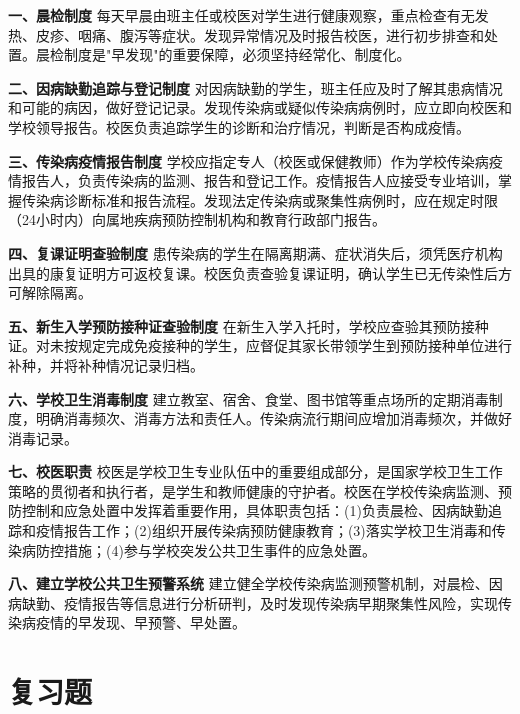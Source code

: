 \begin{keybox}
\textbf{一、晨检制度}
每天早晨由班主任或校医对学生进行健康观察，重点检查有无发热、皮疹、咽痛、腹泻等症状。发现异常情况及时报告校医，进行初步排查和处置。晨检制度是"早发现"的重要保障，必须坚持经常化、制度化。

\textbf{二、因病缺勤追踪与登记制度}
对因病缺勤的学生，班主任应及时了解其患病情况和可能的病因，做好登记记录。发现传染病或疑似传染病病例时，应立即向校医和学校领导报告。校医负责追踪学生的诊断和治疗情况，判断是否构成疫情。

\textbf{三、传染病疫情报告制度}
学校应指定专人（校医或保健教师）作为学校传染病疫情报告人，负责传染病的监测、报告和登记工作。疫情报告人应接受专业培训，掌握传染病诊断标准和报告流程。发现法定传染病或聚集性病例时，应在规定时限（24小时内）向属地疾病预防控制机构和教育行政部门报告。

\textbf{四、复课证明查验制度}
患传染病的学生在隔离期满、症状消失后，须凭医疗机构出具的康复证明方可返校复课。校医负责查验复课证明，确认学生已无传染性后方可解除隔离。

\textbf{五、新生入学预防接种证查验制度}
在新生入学入托时，学校应查验其预防接种证。对未按规定完成免疫接种的学生，应督促其家长带领学生到预防接种单位进行补种，并将补种情况记录归档。

\textbf{六、学校卫生消毒制度}
建立教室、宿舍、食堂、图书馆等重点场所的定期消毒制度，明确消毒频次、消毒方法和责任人。传染病流行期间应增加消毒频次，并做好消毒记录。

\textbf{七、校医职责}
校医是学校卫生专业队伍中的重要组成部分，是国家学校卫生工作策略的贯彻者和执行者，是学生和教师健康的守护者。校医在学校传染病监测、预防控制和应急处置中发挥着重要作用，具体职责包括：(1)负责晨检、因病缺勤追踪和疫情报告工作；(2)组织开展传染病预防健康教育；(3)落实学校卫生消毒和传染病防控措施；(4)参与学校突发公共卫生事件的应急处置。

\textbf{八、建立学校公共卫生预警系统}
建立健全学校传染病监测预警机制，对晨检、因病缺勤、疫情报告等信息进行分析研判，及时发现传染病早期聚集性风险，实现传染病疫情的早发现、早预警、早处置。
\end{keybox}

\section{复习题}

